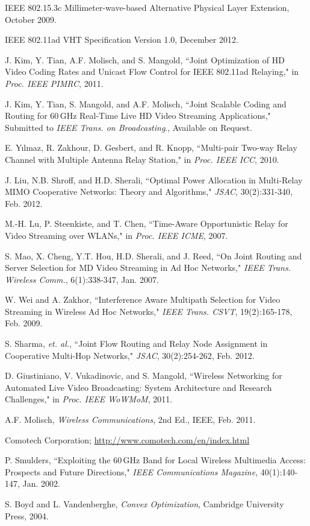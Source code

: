 \documentclass[conference]{IEEEtran}
\begin{document}
\begin{thebibliography}{15}
IEEE 802.15.3c Millimeter-wave-based Alternative Physical Layer Extension,
October 2009.

IEEE 802.11ad VHT Specification Version 1.0, December 2012.

J. Kim, Y. Tian, A.F. Molisch, and S. Mangold,
``Joint Optimization of HD Video Coding Rates and Unicast Flow Control for IEEE 802.11ad Relaying,"
in \textit{Proc. IEEE PIMRC}, 2011.


J. Kim, Y. Tian, S. Mangold, and A.F. Molisch,
``Joint Scalable Coding and Routing for 60\,GHz Real-Time Live HD Video Streaming Applications,"
Submitted to \textit{IEEE Trans. on Broadcasting}., Available on Request.

E. Yılmaz, R. Zakhour, D. Gesbert, and R. Knopp,
``Multi-pair Two-way Relay Channel with Multiple Antenna Relay Station,"
in \textit{Proc. IEEE ICC}, 2010.

J. Liu, N.B. Shroff, and H.D. Sherali,
``Optimal Power Allocation in Multi-Relay MIMO Cooperative Networks: Theory and Algorithms,"
\textit{JSAC}, 30(2):331-340, Feb. 2012.

M.-H. Lu, P. Steenkiste, and T. Chen,
``Time-Aware Opportunistic Relay for Video Streaming over WLANs,"
in \textit{Proc. IEEE ICME}, 2007.

S. Mao, X. Cheng, Y.T. Hou, H.D. Sherali, and J. Reed,
``On Joint Routing and Server Selection for MD Video Streaming in Ad Hoc Networks,"
\textit{IEEE Trans. Wireless Comm.}, 6(1):338-347, Jan. 2007.

W. Wei and A. Zakhor,
``Interference Aware Multipath Selection for Video Streaming in Wireless Ad Hoc Networks,"
\textit{IEEE Trans. CSVT}, 19(2):165-178, Feb. 2009.

S. Sharma, \textit{et. al.},
``Joint Flow Routing and Relay Node Assignment in Cooperative Multi-Hop Networks,"
\textit{JSAC}, 30(2):254-262, Feb. 2012.

D. Giustiniano, V. Vukadinovic, and S. Mangold,
``Wireless Networking for Automated Live Video Broadcasting: System Architecture and Research Challenges,"
in \textit{Proc. IEEE WoWMoM}, 2011.

A.F. Molisch,
\textit{Wireless Communications}, 2nd Ed., IEEE, Feb. 2011.

Comotech Corporation; \url{http://www.comotech.com/en/index.html}

P. Smulders,
``Exploiting the 60\,GHz Band for Local Wireless Multimedia Access: Prospects and Future Directions,"
\textit{IEEE Communications Magazine}, 40(1):140-147, Jan. 2002.


S. Boyd and L. Vandenberghe, \textit{Convex Optimization}, Cambridge University Press, 2004.
\end{thebibliography}
\end{document}
